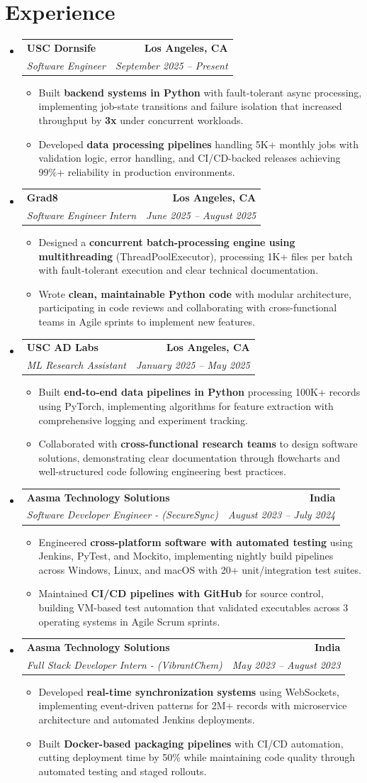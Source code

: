 \documentclass[letterpaper,10pt]{article}
\makeatletter
\newcommand{\resumeItem}[1]{\item\small{{#1 \vspace{-2pt}}}}
\newcommand{\resumeSubheading}[4]{\vspace{-1pt}\item\begin{tabular*}{1.0\textwidth}[t]{l@{\extracolsep{\fill}}r}\textbf{#1} & \textbf{\small #2} \\\textit{\small#3} & \textit{\small #4} \\\end{tabular*}\vspace{-2pt}}
\newcommand{\resumeSubHeadingListStart}{\begin{itemize}[leftmargin=0.0in, label={}]}
\newcommand{\resumeSubHeadingListEnd}{\end{itemize}}
\newcommand{\resumeItemListStart}{\begin{itemize}[leftmargin=0.15in,label=\textbullet,itemsep=2pt,topsep=0pt,parsep=0pt,partopsep=0pt]}
\newcommand{\resumeItemListEnd}{\end{itemize}\vspace{-4pt}}
\makeatother
\begin{document}
\section{Experience}
\resumeSubHeadingListStart
\resumeSubheading{USC Dornsife}{Los Angeles, CA}{Software Engineer}{September 2025 -- Present}
\resumeItemListStart
\resumeItem{Built \textbf{backend systems in Python} with fault-tolerant async processing, implementing job-state transitions and failure isolation that increased throughput by \textbf{3x} under concurrent workloads.}
\resumeItem{Developed \textbf{data processing pipelines} handling 5K+ monthly jobs with validation logic, error handling, and CI/CD-backed releases achieving 99\%+ reliability in production environments.}
\resumeItemListEnd
\resumeSubheading{Grad8}{Los Angeles, CA}{Software Engineer Intern}{June 2025 -- August 2025}
\resumeItemListStart
\resumeItem{Designed a \textbf{concurrent batch-processing engine using multithreading} (ThreadPoolExecutor), processing 1K+ files per batch with fault-tolerant execution and clear technical documentation.}
\resumeItem{Wrote \textbf{clean, maintainable Python code} with modular architecture, participating in code reviews and collaborating with cross-functional teams in Agile sprints to implement new features.}
\resumeItemListEnd
\resumeSubheading{USC AD Labs}{Los Angeles, CA}{ML Research Assistant}{January 2025 -- May 2025}
\resumeItemListStart
\resumeItem{Built \textbf{end-to-end data pipelines in Python} processing 100K+ records using PyTorch, implementing algorithms for feature extraction with comprehensive logging and experiment tracking.}
\resumeItem{Collaborated with \textbf{cross-functional research teams} to design software solutions, demonstrating clear documentation through flowcharts and well-structured code following engineering best practices.}
\resumeItemListEnd
\resumeSubheading{Aasma Technology Solutions}{India}{Software Developer Engineer - (SecureSync)}{August 2023 -- July 2024}
\resumeItemListStart
\resumeItem{Engineered \textbf{cross-platform software with automated testing} using Jenkins, PyTest, and Mockito, implementing nightly build pipelines across Windows, Linux, and macOS with 20+ unit/integration test suites.}
\resumeItem{Maintained \textbf{CI/CD pipelines with GitHub} for source control, building VM-based test automation that validated executables across 3 operating systems in Agile Scrum sprints.}
\resumeItemListEnd
\resumeSubheading{Aasma Technology Solutions}{India}{Full Stack Developer Intern - (VibrantChem)}{May 2023 -- August 2023}
\resumeItemListStart
\resumeItem{Developed \textbf{real-time synchronization systems} using WebSockets, implementing event-driven patterns for 2M+ records with microservice architecture and automated Jenkins deployments.}
\resumeItem{Built \textbf{Docker-based packaging pipelines} with CI/CD automation, cutting deployment time by 50\% while maintaining code quality through automated testing and staged rollouts.}
\resumeItemListEnd
\resumeSubHeadingListEnd
\vspace{-14pt}
\end{document}
